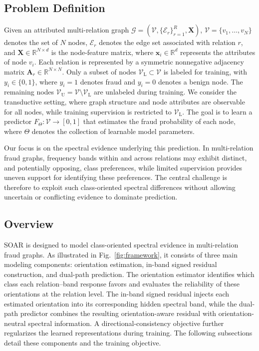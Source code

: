 \documentclass[10pt,journal]{IEEEtran}
\begin{document}
\subsection{Problem Definition}
\label{sec:problem}

Given an attributed multi-relation graph
$\mathcal{G}=(\mathcal{V},\{\mathcal{E}_r\}_{r=1}^{R},\mathbf{X})$,
$\mathcal{V}=\{v_1,\ldots,v_N\}$ denotes the set of $N$ nodes,
$\mathcal{E}_r$ denotes the edge set associated with relation $r$, and
$\mathbf{X}\in\mathbb{R}^{N\times d}$ is the node-feature matrix, where
$\mathbf{x}_i\in\mathbb{R}^{d}$ represents the attributes of node $v_i$.
Each relation is represented by a symmetric nonnegative adjacency matrix
$\mathbf{A}_r\in\mathbb{R}^{N\times N}$.
Only a subset of nodes
$\mathcal{V}_{\mathrm L}\subset\mathcal{V}$ is labeled for training, with
$y_i\in\{0,1\}$, where $y_i=1$ denotes fraud and $y_i=0$ denotes a benign node.
The remaining nodes
$\mathcal{V}_{\mathrm U}=\mathcal{V}\setminus\mathcal{V}_{\mathrm L}$
are unlabeled during training.
We consider the transductive setting, where graph structure and node
attributes are observable for all nodes, while training supervision is
restricted to $\mathcal{V}_{\mathrm L}$.
The goal is to learn a predictor
$F_{\Theta}:\mathcal{V}\rightarrow[0,1]$
that estimates the fraud probability of each node, where $\Theta$ denotes
the collection of learnable model parameters.

Our focus is on the spectral evidence underlying this prediction.
In multi-relation fraud graphs, frequency bands within and across relations
may exhibit distinct, and potentially opposing, class preferences, while
limited supervision provides uneven support for identifying these preferences.
The central challenge is therefore to exploit such class-oriented spectral
differences without allowing uncertain or conflicting evidence to dominate
prediction.


\subsection{Overview}
\label{sec:overview}

SOAR is designed to model class-oriented spectral evidence in multi-relation
fraud graphs. As illustrated in Fig.~\ref{fig:framework}, it consists of three
main modeling components: orientation estimation, in-band signed residual
construction, and dual-path prediction. The orientation estimator identifies
which class each relation--band response favors and evaluates the reliability
of these orientations at the relation level. The in-band signed residual
injects each estimated orientation into its corresponding hidden spectral
band, while the dual-path predictor combines the resulting orientation-aware
residual with orientation-neutral spectral information. A directional-consistency
objective further regularizes the learned representations during training.
The following subsections detail these components and the training objective.
\end{document}
